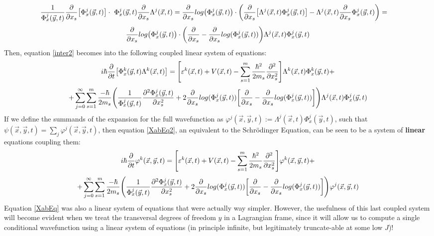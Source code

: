 \documentclass[11pt, a4paper]{article} %
\begin{document}
\begin{equation}
\hspace*{-0.4cm} \frac{1}{\Phi^j_x(\vec{y},t)}\pdv{}{x_s}\qty[\Phi^j_x(\vec{y},t)]\cdot\ \Phi^j_x(\vec{y},t)\pdv{}{x_s}\Lambda^j(\vec{x},t)=\pdv{}{x_s}log\qty(\Phi^j_x(\vec{y},t))\cdot \qty(\pdv{}{x_s}\qty[\Lambda^j(\vec{x},t)\Phi^j_x(\vec{y},t)]-\Lambda^j(\vec{x},t)\pdv{}{x_s}\Phi^j_x(\vec{y},t) )=
\end{equation}\vspace{-0.4cm}
$$
\pdv{}{x_s}log\qty(\Phi^j_x(\vec{y},t))\cdot \qty(\pdv{}{x_s}-\pdv{}{x_s}log(\Phi^j_x(\vec{y},t)) )\Lambda^j(\vec{x},t)\Phi^j_x(\vec{y},t)
$$
Then, equation \eqref{inter2} becomes into the following coupled linear system of equations:
\begin{equation}\label{XabEq2}
 i\hbar\pdv{}{t}\qty[ \Phi^k_x(\vec{y},t)\Lambda^k(\vec{x},t)]=\qty[ \varepsilon^k(\vec{x},t)+V(\vec{x},t)  -\sum_{s=1}^m\frac{\hbar^2}{2m_s}\pdv[2]{}{x_s} ]\Lambda^k(\vec{x},t)\Phi^k_x(\vec{y},t)+
\end{equation}
$$
+\sum_{j=0}^\infty\sum_{s=1}^m \frac{-\hbar}{2m_s}\qty( \frac{1}{\Phi^j_x(\vec{y},t)}\pdv[2]{\Phi^j_x(\vec{y},t)}{x_s}+2\pdv{}{x_s}log(\Phi^j_x(\vec{y},t))\qty[\pdv{}{x_s}-\pdv{}{x_s}log(\Phi^j_x(\vec{y},t))] )\Lambda^j(\vec{x},t)\Phi^j_x(\vec{y},t)
$$
If we define the summands of the expansion for the full wavefunction as $\varphi^j(\vec{x},\vec{y},t):=\Lambda^j(\vec{x},t)\Phi^j_x(\vec{y},t)$, such that $\psi(\vec{x},\vec{y},t)=\sum_j \varphi^j(\vec{x},\vec{y},t)$, then equation \eqref{XabEq2}, an equivalent to the Schrödinger Equation, can be seen to be a system of {\bf linear} equations coupling them:
\begin{equation}\label{XabEq2.5}
 i\hbar\pdv{}{t}\varphi^k(\vec{x},\vec{y},t)=\qty[ \varepsilon^k(\vec{x},t)+V(\vec{x},t)  -\sum_{s=1}^m\frac{\hbar^2}{2m_s}\pdv[2]{}{x_s} ]\varphi^k(\vec{x},\vec{y},t)+
\end{equation}
$$
+\sum_{j=0}^\infty\sum_{s=1}^m \frac{-\hbar}{2m_s}\qty( \frac{1}{\Phi^j_x(\vec{y},t)}\pdv[2]{\Phi^j_x(\vec{y},t)}{x_s}+2\pdv{}{x_s}log(\Phi^j_x(\vec{y},t))\qty[\pdv{}{x_s}-\pdv{}{x_s}log(\Phi^j_x(\vec{y},t))] )\varphi^j(\vec{x},\vec{y},t)
$$
Equation \eqref{XabEq} was also a linear system of equations that were actually way simpler. However, the usefulness of this last coupled system will become evident when we treat the transversal degrees of freedom $y$ in a Lagrangian frame, since it will allow us to compute a single conditional wavefunction using a linear system of equations (in principle infinite, but legitimately truncate-able at some low $J$)!\vspace{-0.3cm}
\end{document}
